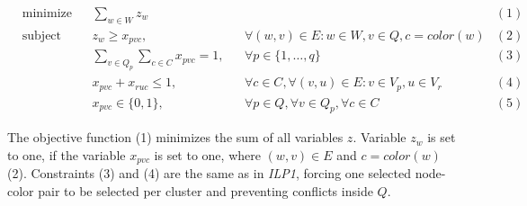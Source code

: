 \begin{equation*}
\begin{aligned}
& \text{minimize} && \sum_{w \in W} z_{w}                                              &&&(1)\\
& \text{subject to} && z_{w} \geq x_{pvc}, && \forall (w,v)\in E : w \in W, v \in Q, c=color(w)                                                            &(2)\\
&&& \sum_{v \in Q_p}\sum_{c \in C} x_{pvc}=1, && \forall p \in \{1,\ldots , q\}   &(3)\\
&&& x_{pvc}+x_{ruc} \leq 1, && \forall c \in C, \forall (v,u) \in E : v\in V_p, u\in V_r     &(4)\\
&&& x_{pvc} \in \{0,1\}, && \forall p \in Q, \forall v \in Q_p, \forall c \in C        &(5)
\end{aligned}
\end{equation*}

The objective function (1) minimizes the sum of all variables $z$. Variable $z_{w}$ is set to one, if the variable $x_{pvc}$ is set to one, where $(w,v)\in E$ and $c=color(w)$ (2). Constraints (3) and (4) are the same as in \textit{ILP1}, forcing one selected node-color pair to be selected per cluster and preventing conflicts inside $Q$.  

